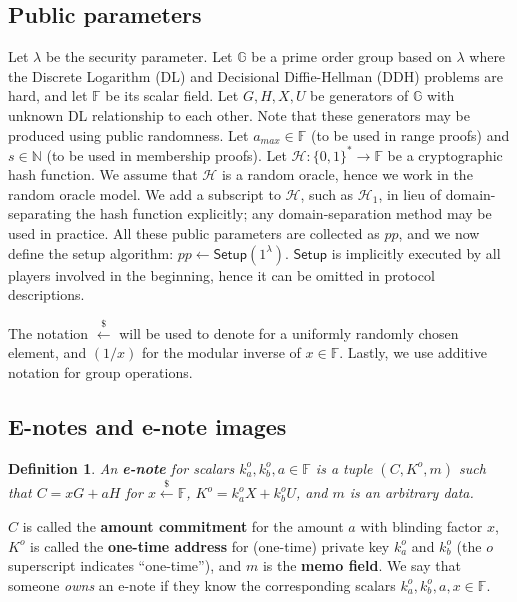 \documentclass{article}
\newtheorem{definition}{Definition}[section]
\begin{document}
\subsection{Public parameters}
Let $\lambda$ be the security parameter. Let $\mathbb{G}$ be a prime order group based on $\lambda$ where the Discrete Logarithm (DL) and Decisional Diffie-Hellman (DDH) problems are hard, and let $\mathbb{F}$ be its scalar field. Let $G, H, X, U$ be generators of $\mathbb{G}$ with unknown DL relationship to each other. Note that these generators may be produced using public randomness. Let $a_{max}\in\mathbb{F}$ (to be used in range proofs) and $s\in\mathbb{N}$ (to be used in membership proofs). Let $\mathcal{H}:\{0,1\}^*\rightarrow\mathbb{F}$ be a cryptographic hash function. We assume that $\mathcal{H}$ is a random oracle, hence we work in the random oracle model. We add a subscript to $\mathcal{H}$, such as $\mathcal{H}_1$, in lieu of domain-separating the hash function explicitly; any domain-separation method may be used in practice. All these public parameters are collected as $pp$, and we now define the setup algorithm: $pp\leftarrow\textsf{Setup}(1^{\lambda})$. $\textsf{Setup}$ is implicitly executed by all players involved in the beginning, hence it can be omitted in protocol descriptions.

The notation $\xleftarrow{\$}$ will be used to denote for a uniformly randomly chosen element, and $(1/x)$ for the modular inverse of $x\in\mathbb{F}$. Lastly, we use additive notation for group operations.

\subsection{E-notes and e-note images}
\begin{definition}\label{e-note}
An \textbf{\em e-note} for scalars $k_a^o, k_b^o, a \in\mathbb{F}$ is a tuple $(C, K^o, m)$ such that $C = x G + a H$ for $x\xleftarrow{\$}\mathbb{F}$, $K^o=k_a^o X + k_b^o U$, and $m$ is an arbitrary data.
\end{definition}
$C$ is called the \textbf{amount commitment} for the amount $a$ with blinding factor $x$, $K^o$ is called the \textbf{one-time address} for (one-time) private key $k_a^o$ and $k_b^o$ (the $o$ superscript indicates ``one-time''), and $m$ is the \textbf{memo field}. We say that someone \textit{owns} an e-note if they know the corresponding scalars $k_a^o, k_b^o, a, x \in\mathbb{F}$.
\end{document}
